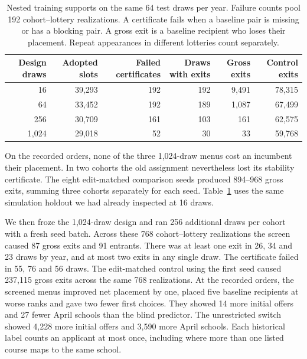 \begin{table}[ht]\centering\small
\caption{Nested training supports on the same 64 test draws per year. Failure counts pool 192 cohort--lottery realizations. A certificate fails when a baseline pair is missing or has a blocking pair. A gross exit is a baseline recipient who loses their placement. Repeat appearances in different lotteries count separately.}\label{tab:nested-risk}
\begin{tabular}{@{}rrrrrr@{}}\toprule
Design draws & Adopted slots & Failed certificates & Draws with exits & Gross exits & Control exits\\\midrule
16 &39,293&192&192&9,491&78,315\\
64 &33,452&192&189&1,087&67,499\\
256 &30,709&161&103&161&62,575\\
1,024 &29,018&52&30&33&59,768\\\bottomrule
\end{tabular}
\end{table}

On the recorded orders, none of the three 1,024-draw menus cost an incumbent their placement. In two cohorts the old assignment nevertheless lost its stability certificate. The eight edit-matched comparison seeds produced 894--968 gross exits, summing three cohorts separately for each seed. Table~\ref{tab:nested-risk} uses the same simulation holdout we had already inspected at 16 draws.

We then froze the 1,024-draw design and ran 256 additional draws per cohort with a fresh seed batch. Across these 768 cohort--lottery realizations the screen caused 87 gross exits and 91 entrants. There was at least one exit in 26, 34 and 23 draws by year, and at most two exits in any single draw. The certificate failed in 55, 76 and 56 draws. The edit-matched control using the first seed caused 237,115 gross exits across the same 768 realizations. At the recorded orders, the screened menus improved net placement by one, placed five baseline recipients at worse ranks and gave two fewer first choices. They showed 14 more initial offers and 27 fewer April schools than the blind predictor. The unrestricted switch showed 4,228 more initial offers and 3,590 more April schools. Each historical label counts an applicant at most once, including where more than one listed course maps to the same school.

